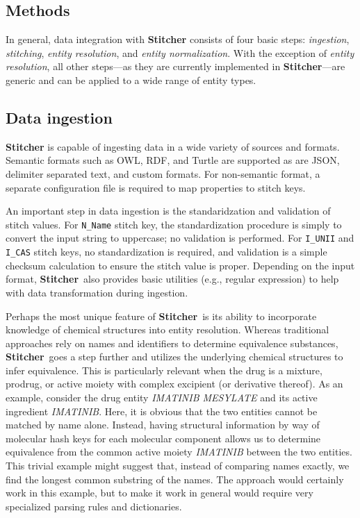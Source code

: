 \documentclass{bioinfo}
\newcommand\st{\textbf{Stitcher}}
\begin{document}
\begin{methods}
\section{Methods}\label{sec:methods}
In general, data integration with \st{} consists of four basic
steps: \emph{ingestion}, \emph{stitching}, \emph{entity resolution},
and \emph{entity normalization}. With the exception of \emph{entity
resolution}, all other steps---as they are currently implemented
in \st---are generic and can be applied to a wide range of entity
types. 

\subsection{Data ingestion}\label{sec:methods-ingest}
\st{} is capable of ingesting data in a wide variety of sources and
formats. Semantic formats such as OWL, RDF, and Turtle are supported
as are JSON, delimiter separated text, and custom formats. For
non-semantic format, a separate configuration file is required to map
properties to stitch keys. 

An important step in data ingestion is the standaridzation and
validation of stitch values. For \texttt{N\_Name} stitch key, the
standardization procedure is simply to convert the input string to
uppercase; no validation is performed. For \texttt{I\_UNII}
and \texttt{I\_CAS} stitch keys, no standardization is required, and
validation is a simple checksum calculation to ensure the stitch value
is proper. Depending on the input format, \st\ also provides basic
utilities (e.g., regular expression) to help with data transformation
during ingestion. 

Perhaps the most unique feature of \st\ is its ability to incorporate
knowledge of chemical structures into entity resolution. Whereas
traditional approaches rely on names and identifiers to determine
equivalence substances, \st\ goes a step further and utilizes the
underlying chemical structures to infer equivalence. This 
is particularly relevant when the drug is a mixture, prodrug, or
active moiety with complex excipient (or derivative thereof). As an
example, consider the drug entity \emph{IMATINIB MESYLATE} and its
active ingredient \emph{IMATINIB}. Here, it is obvious that the two
entities cannot be matched by name alone. Instead, having structural
information by way of molecular hash keys for each molecular component
allows us to determine equivalence from the common active
moiety \emph{IMATINIB} between the two entities. This trivial example
might suggest that, instead of comparing names exactly, we find the
longest common substring of the names. The approach would certainly
work in this example, but to make it work in general would require
very specialized parsing rules and dictionaries. 


\end{methods}
\end{document}
